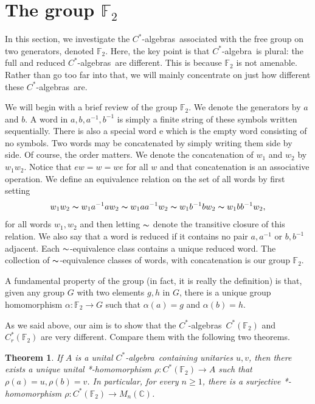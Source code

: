 \documentclass{book}
\newtheorem{theorem}[definition]{Theorem}
\def\cstar{\(C^*\)-algebra}
\def\cstars{\(C^*\)-algebras}
\begin{document}
\section{The group \texorpdfstring{\(\mathbb{F}_2\)}{F2}}
In this section, we investigate the \cstars\ associated with the free group
on two generators, denoted \(\mathbb{F}_2\). Here, the key point is that \cstar\ is
plural: the full and reduced \cstars\ are different. This is because \(\mathbb{F}_2\) is
not amenable. Rather than go too far into that, we will mainly concentrate
on just how different these \cstars\ are.\par
We will begin with a brief review of the group \(\mathbb{F}_2\). We denote the 
generators by \(a\) and \(b\). A word in \(a,b,a^{-1},b^{-1}\) is simply a finite string of these
symbols written sequentially. There is also a special word e which is the
empty word consisting of no symbols. Two words may be concatenated by
simply writing them side by side. Of course, the order matters. We denote
the concatenation of \(w_1\) and \(w_2\) by \(w_1 w_2\). Notice that \(ew = w = we\) for all \(w\)
and that concatenation is an associative operation. We define an equivalence
relation on the set of all words by first setting
\[
  w_1 w_2 \thicksim w_1 a^{-1}aw_2 \thicksim w_1 aa^{-1}w_2 \thicksim w_1 b^{-1}bw_2 \thicksim w_1 bb^{-1}w_ 2,
\]
for all words \(w_1,w_2\) and then letting \(\thicksim\) denote the transitive closure of this
relation. We also say that a word is reduced if it contains no pair \(a,a^{-1}\) or
\(b, b^{-1}\) adjacent. Each \(\thicksim\)-equivalence class contains a unique reduced word.
The collection of \(\thicksim\)-equivalence classes of words, with concatenation is our
group \(\mathbb{F}_2\).\par
A fundamental property of the group (in fact, it is really the definition) is that,
given any group \(G\) with two elements \(g,h\) in \(G\), there is a unique group
homomorphism \(\alpha : \mathbb{F}_2 \rightarrow G\) such that \(\alpha(a) = g\) and \(\alpha(b) = h\).\par
As we said above, our aim is to show that the \cstars\ \(C^*(\mathbb{F}_2)\) and
\(C^*_r(\mathbb{F}_2)\) are very different. Compare them with the following two theorems.
\begin{theorem}
  If \(A\) is a unital \cstar\ containing unitaries \(u,v\), then
  there exists a unique unital *-homomorphism \(\rho : C^*(\mathbb{F}_2) \rightarrow A\) such that
  \(\rho(a) = u,\rho(b) = v\). In particular, for every \(n \geq 1\), there is a surjective
  *-homomorphism \(\rho : C^*(\mathbb{F}_2) \rightarrow M_n(\mathbb{C})\).
\end{theorem}
\end{document}
